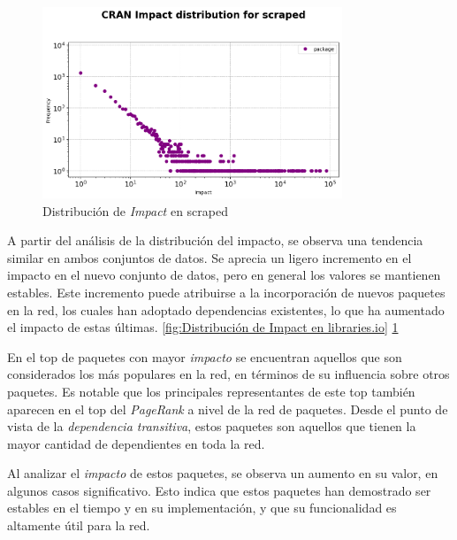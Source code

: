 \begin{figure}[h!]
    \begin{center}
        \includegraphics[width=0.8\textwidth]{img/cran/impact_dist_scraped.png}
        \caption{Distribución de \textit{Impact} en scraped}
        \label{fig:Distribución de Impact en scraped}
    \end{center}
\end{figure}

A partir del análisis de la distribución del impacto, se observa una tendencia similar en ambos
conjuntos de datos. Se aprecia un ligero incremento en el impacto en el nuevo conjunto de datos,
pero en general los valores se mantienen estables. Este incremento puede atribuirse a la incorporación
de nuevos paquetes en la red, los cuales han adoptado dependencias existentes, lo que ha aumentado el
impacto de estas últimas. \ref{fig:Distribución de Impact en libraries.io} \ref{fig:Distribución de Impact en scraped}


En el top de paquetes con mayor \textit{impacto} se encuentran aquellos que son considerados los más populares
en la red, en términos de su influencia sobre otros paquetes. Es notable que los principales representantes
de este top también aparecen en el top del \textit{PageRank} a nivel de la red de paquetes. Desde el punto
de vista de la \textit{dependencia transitiva}, estos paquetes son aquellos que tienen la mayor cantidad de
dependientes en toda la red.

Al analizar el \textit{impacto} de estos paquetes, se observa un aumento en su valor, en algunos casos
significativo. Esto indica que estos paquetes han demostrado ser estables en el tiempo y en su implementación,
y que su funcionalidad es altamente útil para la red.

